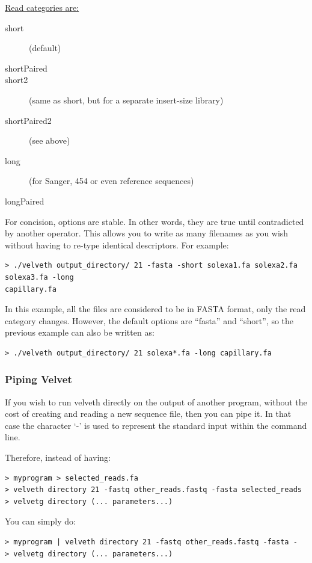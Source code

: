 \documentclass{article}
\begin{document}
\underline{Read categories are:}
\begin{description}
\item[short] (default)
\item[shortPaired]
\item[short2] (same as short, but for a separate insert-size library)
\item[shortPaired2] (see above) 
\item[long] (for Sanger, 454 or even reference sequences)
\item[longPaired]
\end{description}

For concision, options are stable. In other words, they are true until
contradicted by another operator. This allows you to write as many filenames
as you wish without having to re-type identical descriptors.  For example:
\begin{verbatim}
> ./velveth output_directory/ 21 -fasta -short solexa1.fa solexa2.fa solexa3.fa -long
capillary.fa
\end{verbatim}

In this example, all the files are considered to be in FASTA format, only the read category changes. However, the default options are ``fasta'' and ``short'', so the previous example can also be written as:

\begin{verbatim}
> ./velveth output_directory/ 21 solexa*.fa -long capillary.fa
\end{verbatim}

\subsubsection{Piping Velvet}

If you wish to run velveth directly on the output of another program, without the cost of creating and reading a new sequence file, then you can pipe it. In that case the character `-' is used to represent the standard input within the command line. 

Therefore, instead of having:

\begin{verbatim}
> myprogram > selected_reads.fa
> velveth directory 21 -fastq other_reads.fastq -fasta selected_reads
> velvetg directory (... parameters...) 
\end{verbatim}

You can simply do:

\begin{verbatim}
> myprogram | velveth directory 21 -fastq other_reads.fastq -fasta -
> velvetg directory (... parameters...) 
\end{verbatim}
\end{document}
